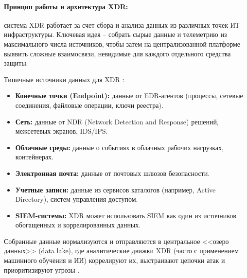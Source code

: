 \paragraph*{Принцип работы и архитектура XDR:} система XDR работает за счет сбора и анализа данных из различных точек ИТ-инфраструктуры. Ключевая идея -- собрать сырые данные и телеметрию из максимального числа источников, чтобы затем на централизованной платформе выявить сложные взаимосвязи, невидимые для каждого отдельного средства защиты.

Типичные источники данных для XDR \cite{KasperskyXDR}:
\begin{itemize}
    \item \textbf{Конечные точки (Endpoint):} данные от EDR-агентов (процессы, сетевые соединения, файловые операции, ключи реестра).
    \item \textbf{Сеть:} данные от NDR (Network Detection and Response) решений, межсетевых экранов, IDS/IPS.
    \item \textbf{Облачные среды:} данные о событиях в облачных рабочих нагрузках, контейнерах.
    \item \textbf{Электронная почта:} данные от почтовых шлюзов безопасности.
    \item \textbf{Учетные записи:} данные из сервисов каталогов (например, Active Directory), систем управления доступом.
    \item \textbf{SIEM-системы:} XDR может использовать SIEM как один из источников обогащенных и коррелированных данных.
\end{itemize}

Собранные данные нормализуются и отправляются в центральное <<озеро данных>> (data lake), где аналитические движки XDR (часто с применением машинного обучения и ИИ) коррелируют их, выстраивают цепочки атак и приоритизируют угрозы \cite{KasperskyXDR}.

